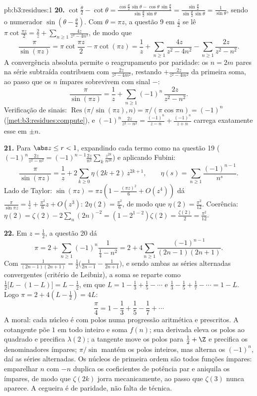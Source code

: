 \begin{solution}{pb:b3:residues:1}
\textbf{20.} $\cot\frac\theta2 - \cot\theta =
\frac{\cos\frac\theta2\,\sin\theta -
\cos\theta\,\sin\frac\theta2}{\sin\frac\theta2\,\sin\theta}
= \frac{\sin\frac\theta2}{\sin\frac\theta2\,\sin\theta} =
\frac1{\sin\theta}$, sendo o numerador $\sin(\theta -
\frac\theta2)$. Com $\theta = \pi z$, a questão 9 em
$\frac z2$ se lê $\pi\cot\frac{\pi z}2 = \frac2z +
\sum_{n\geq1}\frac{4z}{z^2 - 4n^2}$, de modo que
\[
\frac{\pi}{\sin(\pi z)}
= \pi\cot\frac{\pi z}2 - \pi\cot(\pi z)
= \frac1z + \sum_{n\geq1}\frac{4z}{z^2 - 4n^2}
- \sum_{n\geq1}\frac{2z}{z^2 - n^2} .
\]
A convergência absoluta permite o reagrupamento por paridade: os
$n
= 2m$ pares na série subtraída contribuem com
$\frac{2z}{z^2-4m^2}$, restando $+\frac{2z}{z^2-4m^2}$ da
primeira soma, ao passo que os $n$ ímpares sobrevivem com sinal $-$:
\[
\frac{\pi}{\sin(\pi z)} = \frac1z +
\sum_{n\geq1}(-1)^n\,\frac{2z}{z^2 - n^2} .
\]
Verificação de sinais: $\operatorname{Res}\bigl(\pi/\sin(\pi z),
n\bigr) = \pi/(\pi\cos\pi n) = (-1)^n$
(\cref{met:b3:residues:compute}), e $(-1)^n\frac{2z}{z^2 -
n^2} = \frac{(-1)^n}{z-n} + \frac{(-1)^n}{z+n}$ carrega
exatamente esse  em $\pm n$.

\textbf{21.} Para $\abs z \leq r < 1$, expandindo cada termo como
na questão 19 ($(-1)^n\frac{2z}{z^2-n^2} =
(-1)^{n-1}\frac{2z}{n^2}\sum_k\frac{z^{2k}}{n^{2k}}$) e
aplicando Fubini:
\[
\frac{\pi}{\sin(\pi z)} = \frac1z +
2\sum_{k\geq0}\eta(2k+2)\,z^{2k+1},
\qquad
\eta(s) = \sum_{n\geq1}\frac{(-1)^{n-1}}{n^s} .
\]
Lado de Taylor: $\sin(\pi z) = \pi z(1 - \frac{(\pi z)^2}6 +
O(z^4))$ dá $\frac\pi{\sin\pi z} = \frac1z +
\frac{\pi^2}6z + O(z^3)$: $2\eta(2) = \frac{\pi^2}6$, de modo que
$\eta(2) = \frac{\pi^2}{12}$. Coerência: $\eta(2) =
\zeta(2) - 2\sum_n(2n)^{-2} = (1 - 2^{1-2})\zeta(2) =
\frac{\zeta(2)}2 = \frac{\pi^2}{12}$.

\textbf{22.} Em $z = \frac12$, a questão 20 dá
\[
\pi = 2 + \sum_{n\geq1}(-1)^n\frac{1}{\frac14 - n^2}
= 2 + 4\sum_{n\geq1}\frac{(-1)^{n-1}}{(2n-1)(2n+1)} .
\]
Com $\frac1{(2n-1)(2n+1)} = \frac12\bigl(\frac1{2n-1} -
\frac1{2n+1}\bigr)$, e sendo ambas as séries alternadas convergentes
(critério de Leibniz), a soma se reparte como $\frac12\bigl[L -
(1 - L)\bigr] = L - \frac12$, em que $L = 1 - \frac13 +
\frac15 - \cdots$ e $\frac13 - \frac15 + \frac17 - \cdots
= 1 - L$. Logo $\pi = 2 + 4(L - \frac12) = 4L$:
\[
\frac\pi4 = 1 - \frac13 + \frac15 - \frac17 + \cdots
\]
A moral: cada núcleo é  com polos numa
progressão aritmética e  prescritos. A
cotangente põe  $1$ em todo inteiro e soma
$f(n)$; sua derivada eleva os polos ao quadrado e precifica
$\lambda(2)$; a tangente move os polos para $\frac12 + \Z$
e precifica os denominadores ímpares; $\pi/\sin$ mantém os
polos inteiros, mas alterna os  $(-1)^n$, daí
as séries alternadas. Os núcleos de primeira ordem são todos funções
ímpares: emparelhar $n$ com $-n$ duplica os coeficientes de potência par
e aniquila os ímpares, de modo que $\zeta(2k)$
jorra mecanicamente, ao passo que $\zeta(3)$ nunca aparece. A
cegueira é de paridade, não falta de técnica.


\end{solution}
